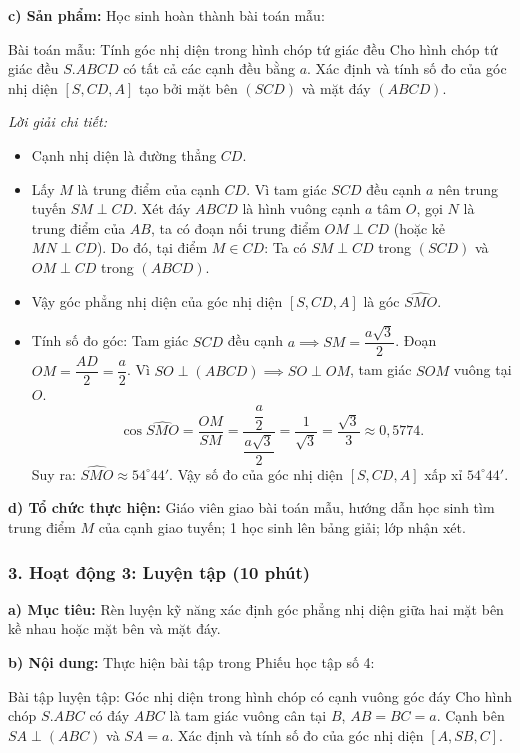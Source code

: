 \documentclass[12pt, a4paper]{article}
\begin{document}
\noindent \textbf{c) Sản phẩm:}
Học sinh hoàn thành bài toán mẫu:
\begin{pedabox}{Bài toán mẫu: Tính góc nhị diện trong hình chóp tứ giác đều}
Cho hình chóp tứ giác đều $S.ABCD$ có tất cả các cạnh đều bằng $a$.
Xác định và tính số đo của góc nhị diện $[S, CD, A]$ tạo bởi mặt bên $(SCD)$ và mặt đáy $(ABCD)$.
\end{pedabox}
\textit{Lời giải chi tiết:}
\begin{itemize}
    \item Cạnh nhị diện là đường thẳng $CD$.
    \item Lấy $M$ là trung điểm của cạnh $CD$.
    Vì tam giác $SCD$ đều cạnh $a$ nên trung tuyến $SM \perp CD$.
    Xét đáy $ABCD$ là hình vuông cạnh $a$ tâm $O$, gọi $N$ là trung điểm của $AB$, ta có đoạn nối trung điểm $OM \perp CD$ (hoặc kẻ $MN \perp CD$).
    Do đó, tại điểm $M \in CD$: Ta có $SM \perp CD$ trong $(SCD)$ và $OM \perp CD$ trong $(ABCD)$.
    \item Vậy góc phẳng nhị diện của góc nhị diện $[S, CD, A]$ là góc $\widehat{SMO}$.
    \item Tính số đo góc:
    Tam giác $SCD$ đều cạnh $a \implies SM = \dfrac{a\sqrt{3}}{2}$.
    Đoạn $OM = \dfrac{AD}{2} = \dfrac{a}{2}$.
    Vì $SO \perp (ABCD) \implies SO \perp OM$, tam giác $SOM$ vuông tại $O$.
    $$\cos \widehat{SMO} = \dfrac{OM}{SM} = \dfrac{\dfrac{a}{2}}{\dfrac{a\sqrt{3}}{2}} = \dfrac{1}{\sqrt{3}} = \dfrac{\sqrt{3}}{3} \approx 0{,}5774.$$
    Suy ra: $\widehat{SMO} \approx 54^\circ 44'$.
    Vậy số đo của góc nhị diện $[S, CD, A]$ xấp xỉ $54^\circ 44'$.
\end{itemize}

\noindent \textbf{d) Tổ chức thực hiện:}
Giáo viên giao bài toán mẫu, hướng dẫn học sinh tìm trung điểm $M$ của cạnh giao tuyến; 1 học sinh lên bảng giải; lớp nhận xét.

\subsubsection*{3. Hoạt động 3: Luyện tập (10 phút)}

\noindent \textbf{a) Mục tiêu:}
Rèn luyện kỹ năng xác định góc phẳng nhị diện giữa hai mặt bên kề nhau hoặc mặt bên và mặt đáy.

\noindent \textbf{b) Nội dung:}
Thực hiện bài tập trong Phiếu học tập số 4:
\begin{pedabox}{Bài tập luyện tập: Góc nhị diện trong hình chóp có cạnh vuông góc đáy}
Cho hình chóp $S.ABC$ có đáy $ABC$ là tam giác vuông cân tại $B$, $AB = BC = a$. Cạnh bên $SA \perp (ABC)$ và $SA = a$.
Xác định và tính số đo của góc nhị diện $[A, SB, C]$.
\end{pedabox}
\end{document}
